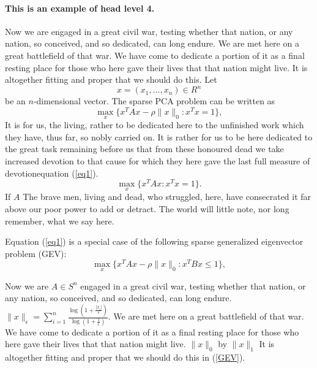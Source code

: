 \documentclass{pasa}%
\begin{document}
\paragraph{This is an example of head level 4.}
Now we are engaged in a great civil war, testing whether that nation, or any nation, so conceived, and so dedicated, can long endure. We are met here on a great battlefield of that war. We have come to dedicate a portion of it as a final resting place for those who here gave their lives that that nation might live. It is altogether fitting and proper that we should do this.
Let
\[
x=(x_1,\dots,x_n)\in R^n
\]be an \(n\)-dimensional vector. The sparse PCA problem can be written as
\begin{equation}\label{eq1}
\max\limits_{x}\{x^TAx-\rho\|x\|_0:x^Tx=1\},
\end{equation}
It is for us, the living, rather to be dedicated here to the unfinished work which they have, thus far, so nobly carried on. It is rather for us to be here dedicated to the great task remaining before us  that from these honoured dead we take increased devotion to that cause for which they here gave the last full measure of devotion\break equation (\ref{eq1}). 
\[\max\limits_{x}\{x^TAx :x^Tx=1\}.\]
If $A$ The brave men, living and dead, who struggled, here, have consecrated it far above our poor power to add or detract. The world will little note, nor long remember, what we say here.


Equation (\ref{eq1}) is a special case of the following sparse generalized eigenvector problem (GEV):
\begin{equation}\label{GEV}
\max\limits_{x}\{x^TAx-\rho \|x\|_0: x^TBx\leq 1\},
\end{equation}

Now we are $A\in S^n $ engaged in a great civil war, testing whether that nation, or any nation, so conceived, and so dedicated, can long endure. $\|x\|_\epsilon= \sum\limits_{i=1}^n\frac{\log(1+\frac{|x_i|}{\epsilon})}{\log(1+\frac{1}{\epsilon})}.$ We are met here on a great battlefield of that war. We have come to dedicate a portion of it as a final resting place for those who here gave their lives that that nation might live. $\|x\|_0$ by $\|x\|_1$ It is altogether fitting and proper that we should do this in (\ref{GEV}).
\end{document}
